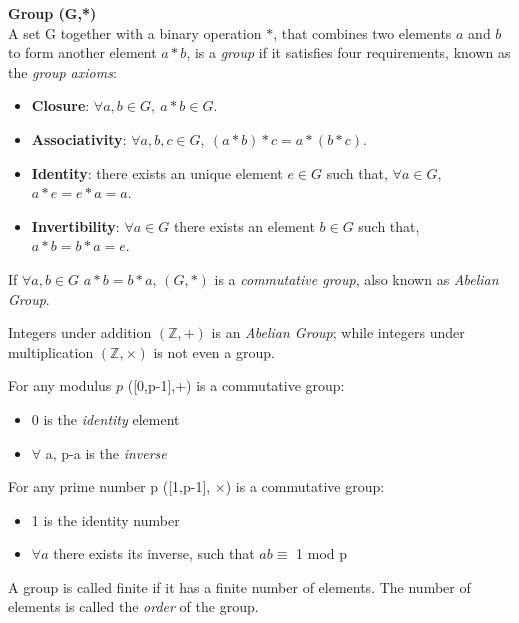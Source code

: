 \begin{teorema}{\textbf{Group (G,*)}}\\
	A set G together with a binary operation $*$, that combines two elements $a$ and $b$ to form another element $a*b$, is a \textit{group} if it satisfies four requirements, known as the \textit{group axioms}:
	\begin{itemize}
		\item \textbf{Closure}: $\forall a,b \in G,\ a*b \in G$.
		\item \textbf{Associativity}: $\forall a,b,c \in G,\ (a*b)*c=a*(b*c)$.
		\item \textbf{Identity}: there exists an unique element $e \in G$ such that, $\forall a\in G$, $a*e=e*a=a$.
		\item \textbf{Invertibility}: $\forall a\in G$ there exists an element $b\in G$ such that, $a*b=b*a=e$.
	\end{itemize}
\end{teorema}

If $\forall a,b\in G$ $a*b=b*a$, $(G,*)$ is a \textit{commutative group}, also known as \textit{Abelian Group}.
\begin{example}
	Integers under addition $(\mathbb{Z},+)$ is an \textit{Abelian Group}; while integers under multiplication $(\mathbb{Z},\times)$ is not even a group.
\end{example}

\begin{example}
	For any modulus $p$ ([0,p-1],+) is a commutative group:
	\begin{itemize}
		\item $0$ is the \textit{identity} element 
		\item $\forall$ a, p-a is the \textit{inverse}
	\end{itemize}
\end{example}

\begin{example}
	For any prime number p ([1,p-1], $\times $) is a commutative group:
	\begin{itemize}
		\item 1 is the identity number
		\item $\forall a$ there exists its inverse, such that $ab\equiv$ 1 mod p	
	\end{itemize}
\end{example}

A group is called finite if it has a finite number of elements. The number of elements is called the \textit{order} of the group.\\

